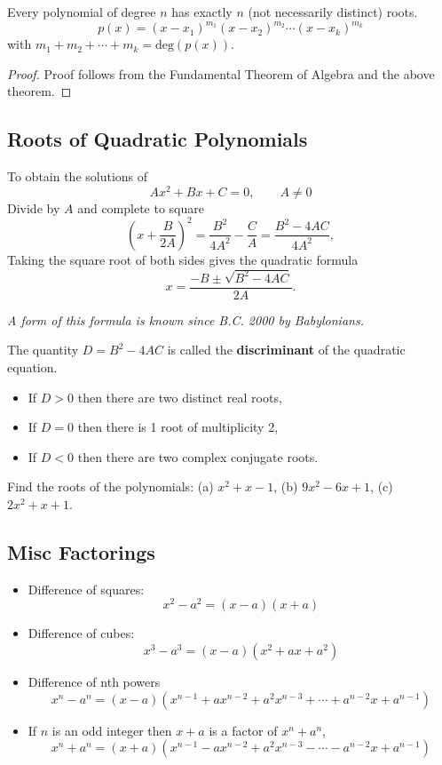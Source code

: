 \documentclass[../calc1-main.tex]{subfiles}
\begin{document}
\begin{theorem}
  Every polynomial of degree $n$ has exactly $n$ (not necessarily distinct) roots.
  \[
    p(x) = (x-x_1)^{m_1}(x-x_2)^{m_2}\cdots(x-x_k)^{m_k}
  \]
  with $m_1 + m_2 + \cdots + m_k = \text{deg}(p(x))$.
\end{theorem}
\begin{proof}
  Proof follows from the Fundamental Theorem of Algebra and the above theorem.
\end{proof}
\subsection*{Roots of Quadratic Polynomials}
To obtain the solutions of
\[
  A x^2 + B x + C = 0, \qquad A \neq 0
\]
Divide by $A$ and complete to square
\[
  \left(x + \frac{B}{2A}\right)^2 = \frac{B^2}{4A^2} - \frac{C}{A} = \frac{B^2-4AC}{4A^2},
\]
Taking the square root of both sides gives the quadratic formula
\[
  x = \frac{-B \pm \sqrt{B^2 - 4AC}}{2A}.
\]

\textit{A form of this formula is known since B.C. 2000 by Babylonians.}

The quantity $D=B^2 - 4AC$ is called the \textbf{discriminant} of the quadratic equation.

\begin{itemize}
  \item If $D>0$ then there are two distinct real roots,
  \item If $D=0$ then there is 1 root of multiplicity 2,
  \item If $D<0$ then there are two complex conjugate roots.
\end{itemize}

\begin{example}
  Find the roots of the polynomials: (a) $x^2+x-1$, (b) $9x^2 -6x+1$, (c) $2x^2+x+1$.
\end{example}

\subsection*{Misc Factorings}

\begin{itemize}
  \item Difference of squares:
  \[
    x^2 - a^2 = (x-a)(x+a)
  \]
  \item Difference of cubes:
  \[
    x^3 - a^3 = (x-a)(x^2+ax+a^2)
  \]
  \item Difference of nth powers
  \[
    x^n - a^n = (x-a)(x^{n-1}+ a x^{n-2} + a^2 x^{n-3} + \cdots + a^{n-2}x + a^{n-1})
  \]
  \item If $n$ is an odd integer then $x+a$ is a factor of $x^n+a^n$,
  \[
    x^n + a^n = (x+a)(x^{n-1} - a x^{n-2} + a^2 x^{n-3} - \cdots - a^{n-2}x + a^{n-1})
  \]
\end{itemize}
\end{document}
